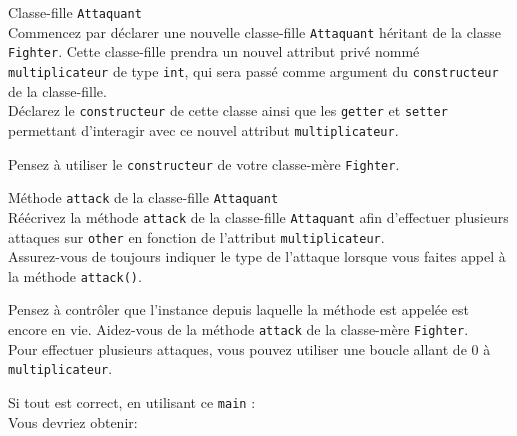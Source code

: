 \begin{Exercice}[5 minutes] Classe-fille \lstinline{Attaquant} \\

Commencez par déclarer une nouvelle classe-fille \lstinline{Attaquant} héritant de la classe \lstinline{Fighter}. Cette classe-fille prendra un nouvel attribut privé nommé \lstinline{multiplicateur} de type \lstinline{int}, qui sera passé comme argument du \lstinline{constructeur} de la classe-fille. \\

Déclarez le \lstinline{constructeur} de cette classe ainsi que les \lstinline{getter} et \lstinline{setter} permettant d'interagir avec ce nouvel attribut \lstinline{multiplicateur}. \\

\begin{conseil}
Pensez à utiliser le \lstinline{constructeur} de votre classe-mère \lstinline{Fighter}.
\end{conseil}

\begin{solution}
	
\end{solution}

\end{Exercice}

\begin{Exercice}[10 minutes] Méthode \lstinline{attack} de la classe-fille \lstinline{Attaquant} \\

Réécrivez la méthode \lstinline{attack} de la classe-fille \lstinline{Attaquant} afin d'effectuer plusieurs attaques sur \lstinline{other} en fonction de l'attribut \lstinline{multiplicateur}. \\

Assurez-vous de toujours indiquer le type de l'attaque lorsque vous faites appel à la méthode \lstinline{attack()}.

\begin{conseil}
Pensez à contrôler que l'instance depuis laquelle la méthode est appelée est encore en vie.
Aidez-vous de la méthode \lstinline{attack} de la classe-mère \lstinline{Fighter}.\\

Pour effectuer plusieurs attaques, vous pouvez utiliser une boucle allant de 0 à \lstinline{multiplicateur}.

\end{conseil}

\begin{solution}
	
\end{solution}

\end{Exercice}

Si tout est correct, en utilisant ce \lstinline{main} : \\

 

Vous devriez obtenir:
 



